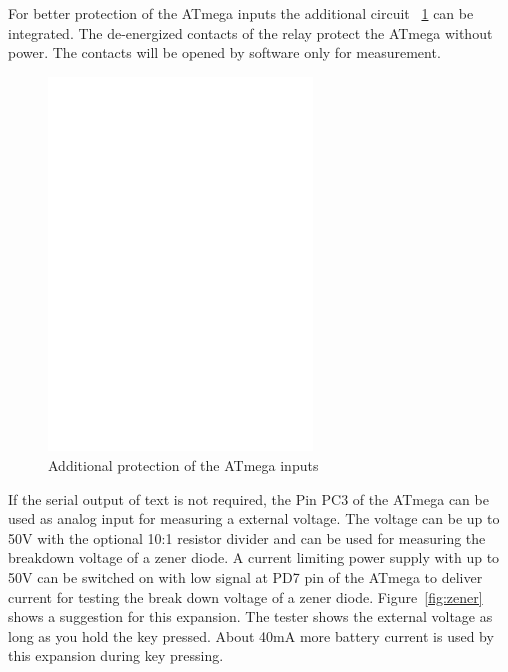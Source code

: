 For better protection of the ATmega inputs the additional circuit~ \ref{fig:relay_addon} 
can be integrated. The de-energized contacts of the relay protect the ATmega without power.
The contacts will be opened by software only for measurement.

\begin{figure}[H]
\centering
\includegraphics[width=7cm]{../FIG/relay_addon.eps}
\caption{Additional protection of the ATmega inputs}
\label{fig:relay_addon}
\end{figure}

If the serial output of text is not required, the Pin PC3 of the ATmega can be used as analog
input for measuring a external voltage. The voltage can be up to 50V with the optional 10:1 resistor
divider and can be used for measuring the breakdown voltage of a zener diode. 
A current limiting power supply with up to 50V can be switched on with low signal at PD7 pin of the
ATmega to deliver current for testing the break down voltage of a zener diode.
Figure~\ref{fig:zener} shows a suggestion for this expansion.
The tester shows the external voltage as long as you hold the key pressed.
About 40mA more battery current is used by this expansion during key pressing.

